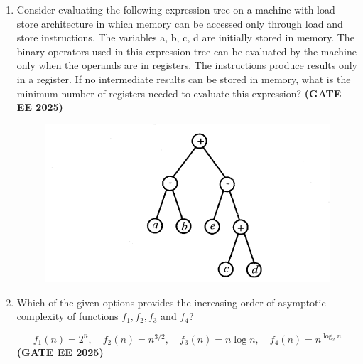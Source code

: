 \documentclass[journal,12pt,onecolumn]{IEEEtran}
\theoremstyle{remark}
\begin{document}
\begin{enumerate}
\item Consider evaluating the following expression tree on a machine with load-store architecture in which memory can be accessed only through load and store instructions. The variables a, b, c, d are initially stored in memory. The binary operators used in this expression tree can be evaluated by the machine only when the operands are in registers. The instructions produce results only in a register. If no intermediate results can be stored in memory, what is the minimum number of registers needed to evaluate this expression? \hfill \textbf{(GATE EE 2025)}
\begin{figure}
    \centering
    \includegraphics[width=0.5\linewidth]{figs/fig5.png}
    \caption{}
    \label{fig5}
\end{figure}

\begin{enumerate}
\end{enumerate}


\item Which of the given options provides the increasing order of asymptotic complexity of functions $f_1, f_2, f_3$ and $f_4$?

\[
f_1(n) = 2^n, \quad f_2(n) = n^{3/2}, \quad f_3(n) = n \log n, \quad f_4(n) = n^{\log_2 n}
\]
\hfill \textbf{(GATE EE 2025)}
\begin{enumerate}
\end{enumerate}



\end{enumerate}
\end{document}
